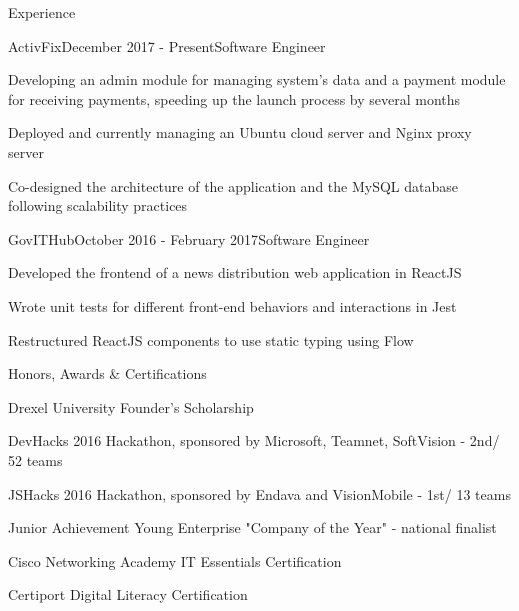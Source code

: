 \documentclass{resume} %
\begin{document}
\begin{rSection}{Experience}

\begin{rSubsection}{ActivFix}{December 2017 - Present}{Software Engineer}{}
\item Developing an admin module for managing system's data and a payment module for receiving payments, speeding up the launch process by several months
\item Deployed and currently managing an Ubuntu cloud server and Nginx proxy server
\item Co-designed the architecture of the application and the MySQL database following scalability practices
\end{rSubsection}



\begin{rSubsection}{GovITHub}{October 2016 - February 2017}{Software Engineer}{}
\item Developed the frontend of a news distribution web application in ReactJS
\item Wrote unit tests for different front-end behaviors and interactions in Jest
\item Restructured ReactJS components to use static typing using Flow
\end{rSubsection}

\end{rSection}



\begin{rSection}{Honors, Awards \& Certifications}
\begin{rSubsection}{}{}{}{}
\item Drexel University Founder’s Scholarship
\item DevHacks 2016 Hackathon, sponsored by Microsoft, Teamnet, SoftVision - 2nd/ 52 teams
\item JSHacks 2016 Hackathon, sponsored by Endava and VisionMobile - 1st/ 13 teams
\item Junior Achievement Young Enterprise "Company of the Year" - national finalist
\item Cisco Networking Academy IT Essentials Certification
\item Certiport Digital Literacy Certification
\end{rSubsection}
\end{rSection}
\end{document}
